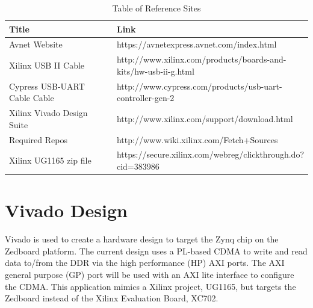 \documentclass[12pt]{article}
\begin{document}
\begin{table}[htbp!]
  \begin{tabular}{|p{0.4\linewidth}|p{0.6\linewidth}|}
    \hline
    \textbf{Title} & \textbf{Link}\\ \hline
     Avnet Website&https://avnetexpress.avnet.com/index.html \\ \hline
     Xilinx USB II Cable& http://www.xilinx.com/products/boards-and-kits/hw-usb-ii-g.html \\ \hline
     Cypress USB-UART Cable Cable&http://www.cypress.com/products/usb-uart-controller-gen-2  \\ \hline
     Xilinx Vivado Design Suite&http://www.xilinx.com/support/download.html  \\ \hline
     Required Repos&http://www.wiki.xilinx.com/Fetch+Sources \\ \hline
     Xilinx UG1165 zip file&https://secure.xilinx.com/webreg/clickthrough.do?cid=383986 \\ \hline

  \end{tabular}
  \caption{Table of Reference Sites}
  \label{table:references}
\end{table}

\section{Vivado Design}  Vivado is used to create a hardware design to target the Zynq chip on the Zedboard platform.  The current design uses a PL-based CDMA to write and read data to/from the DDR via the high performance (HP) AXI ports.  The AXI general purpose (GP) port will be used with an AXI lite interface to configure the CDMA.  This application mimics a Xilinx project, UG1165, but targets the Zedboard instead of the Xilinx Evaluation Board, XC702. 
\end{document}
